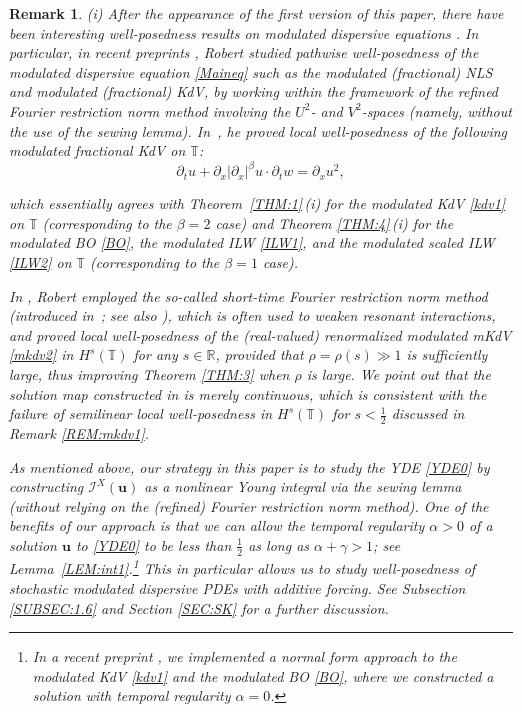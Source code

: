 \documentclass[letterpaper, 11pt,  reqno]{amsart}
\newtheorem{remark}[theorem]{Remark}
\newcommand{\1}{\hspace{0.5mm}\text{I}\hspace{0.5mm}}
\newcommand{\I}{\mathcal{I}}
\newcommand{\noi}{\noindent}
\newcommand{\R}{\mathbb{R}}
\newcommand{\T}{\mathbb{T}}
\newcommand{\al}{\alpha}
\newcommand{\be}{\beta}
\newcommand{\g}{\gamma}
\newcommand{\dx}{\partial_x}
\newcommand{\dt}{\partial_t}
\newcommand{\uu}{\mathbf{u}}
\numberwithin{equation}{section}
\numberwithin{theorem}{section}
\begin{document}
\begin{remark}\label{REM:Tristan}\rm
(i) After the appearance of the first version of this paper, 
there have been 
interesting well-posedness results on 
 modulated dispersive equations
\cite{DR2, G22, Ste, Tanaka, Robert1, Robert2, Robert3, Robert4}.
In particular, 
in recent preprints \cite{Robert2, Robert3}, 
Robert 
studied pathwise  well-posedness of the modulated dispersive equation \eqref{Maineq}
such as the modulated (fractional) NLS and modulated (fractional) KdV, 
%
%
by working within the framework
of 
 the refined Fourier restriction norm method
 involving the $U^2$- and $V^2$-spaces
(namely,  without the use of the sewing lemma).
In~\cite{Robert3}, he proved 
local well-posedness of 
 the following modulated fractional KdV on $\T$:
\[\dt u+    \dx|\dx|^\be u \cdot \dt w=\dx u^2, \]

\noi
 which essentially 
agrees with 
Theorem~\ref{THM:1}\,(i)
for the modulated KdV 
\eqref{kdv1} on $\T$ (corresponding to the $\be = 2$ case)
and 
Theorem \ref{THM:4}\,(i)
for the modulated BO \eqref{BO}, the modulated ILW \eqref{ILW1}, 
and the modulated scaled ILW \eqref{ILW2} on $\T$
(corresponding to the $\be = 1$ case).




In  \cite{Robert3}, 
Robert employed the so-called  short-time Fourier restriction norm method
(introduced in~\cite{KT}; see also \cite{CCT2, IKT, OW2}),
which is often used to  weaken resonant interactions, 
and proved local well-posedness of the (real-valued) 
renormalized modulated mKdV \eqref{mkdv2} in $H^s(\T)$
for any $s \in \R$, provided that $\rho = \rho(s) \gg 1$
is sufficiently large, 
thus improving Theorem \ref{THM:3}
when $\rho$ is large.
We point out that the solution map constructed in 
\cite{Robert3} is merely continuous, which is consistent
with the failure of semilinear local well-posedness 
in $H^s(\T)$ for $s < \frac 12$
discussed in Remark \ref{REM:mkdv1}.


As mentioned above, 
 our strategy in this paper is 
 to  study  the YDE \eqref{YDE0}
by constructing 
 $\I^X(\uu)$ as a nonlinear Young integral 
  via the sewing lemma
(without relying on the (refined) Fourier restriction norm method).
 One of the benefits of our approach 
is that we can allow the temporal regularity $\al > 0$ of
a solution $\uu$ to \eqref{YDE0} to be less than $\frac 12$
as long as $\al + \g > 1$;
see Lemma~\ref{LEM:int1}.\footnote{In a recent preprint \cite{GLLO}, 
we implemented a normal form approach to the modulated KdV \eqref{kdv1}
and the modulated BO \eqref{BO}, where we constructed 
a solution with temporal regularity $\al = 0$.}
This in particular allows us to 
study well-posedness
of stochastic modulated dispersive PDEs with additive forcing.
See 
Subsection \ref{SUBSEC:1.6}
and Section \ref{SEC:SK}
for a further discussion.



\end{remark}
\end{document}
